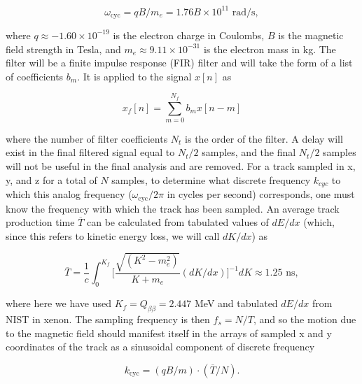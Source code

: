\documentclass{JINST}
\begin{document}
\begin{equation}\label{eqn_wcyc}
\omega_{\mathrm{cyc}} = qB/m_{e} = 1.76B \times 10^{11} \,\, \mathrm{rad/s},
\end{equation}

\noindent where $q \approx -1.60 \times 10^{-19}$ is the electron charge in Coulombs, $B$ is the magnetic field
strength in Tesla, and $m_{e} \approx 9.11 \times 10^{-31}$ is the electron mass in kg.  The filter will be a finite impulse
response (FIR) filter and will take the form of a  list of coefficients $b_{m}$.  It is applied to the signal $x[n]$ as
  
\begin{equation}
  x_{f}[n] = \sum_{m=0}^{N_f} b_{m}x[n-m]
\end{equation}
  
\noindent where the number of filter coefficients $N_{t}$ is the order of the filter.  A delay will exist in the
final filtered signal equal to $N_{t}/2$ samples, and the final $N_{t}/2$ samples will not be useful in the final analysis
and are removed.
For a track sampled in x, y, and z for a total of $N$ samples, to determine what discrete frequency $k_{cyc}$ to which
this analog frequency ($\omega_{\mathrm{cyc}}/2\pi$ in cycles per second) corresponds, one must know the frequency 
with which the track has been sampled.  An average track production time $\overline{T}$ can be calculated from 
tabulated values of $dE/dx$ (which, since this refers to kinetic energy loss, we will call $dK/dx$) as

\begin{equation}\label{eqn_T}
\overline{T} = \frac{1}{c}\int_{0}^{K_{f}} \biggl[\frac{\sqrt{(K^2-m_e^2)}}{K+m_e}(dK/dx)\biggr]^{-1} dK \approx 1.25 \,\, \mathrm{ns},
\end{equation}

\noindent where here we have used $K_{f} = Q_{\beta\beta} = 2.447$ MeV and tabulated 
$dE/dx$ from NIST \cite{NIST_mac} in xenon.  The sampling frequency is then $f_{s} = N/T$, and so the motion
due to the magnetic field should manifest itself in the arrays of sampled x and y coordinates
of the track as a sinusoidal component of discrete frequency 

\begin{equation}\label{eqn_kcyc}
k_{\mathrm{cyc}} = (qB/m)\cdot(\overline{T}/N).
\end{equation}
\end{document}
